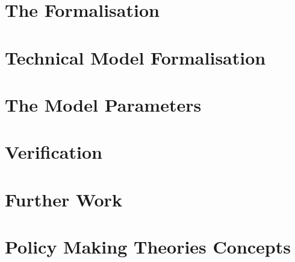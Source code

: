 \documentclass[whitelogo]{tudelft-report}
\begin{document}
\chapter{The Formalisation}
\label{cha:formalisationRevised}
%


\chapter{Technical Model Formalisation}
\label{cha:FFformalisation}


\chapter{The Model Parameters}
\label{cha:modelParameters}


\chapter{Verification}
\label{cha:verification}


\chapter{Further Work}
\label{cha:furtherWork}


\chapter{Policy Making Theories Concepts}
\label{cha:theoriesVModel}









%
%
%
\end{document}

